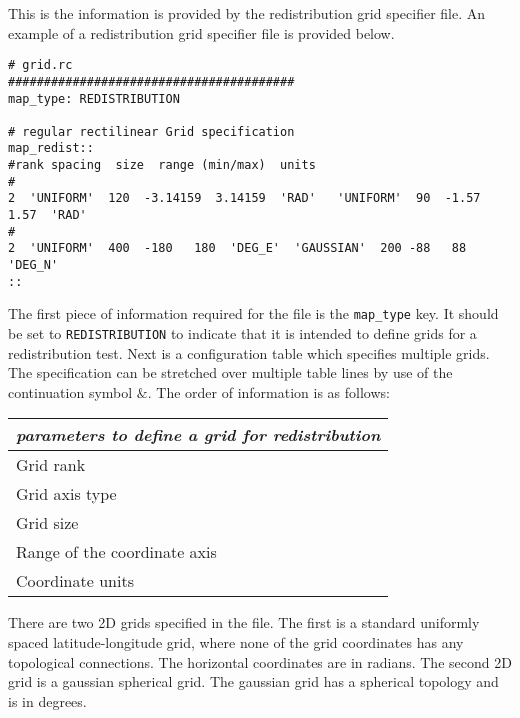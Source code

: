 This is the information is provided by the redistribution grid specifier file.
An example of a redistribution grid specifier file is provided below. 
\begin{center}
\begin{verbatim}
# grid.rc
########################################
map_type: REDISTRIBUTION

# regular rectilinear Grid specification 
map_redist::
#rank spacing  size  range (min/max)  units
#
2  'UNIFORM'  120  -3.14159  3.14159  'RAD'   'UNIFORM'  90  -1.57  1.57  'RAD'   
#
2  'UNIFORM'  400  -180   180  'DEG_E'  'GAUSSIAN'  200 -88   88   'DEG_N'  
::
\end{verbatim}
\end{center}

The first piece of information required for the file is the \texttt{map\_type} key. It should be set to \texttt{REDISTRIBUTION} to indicate that it is intended to define grids for a redistribution test. Next is a configuration table which specifies multiple grids. The specification can be stretched over multiple table lines by use of the continuation symbol $\&$. The order of information is as follows:
\begin{center}
\begin{tabular}{| l |} \hline 
{\em parameters to define a grid for redistribution }  \\
\hline \hline
 Grid rank    \\
 Grid axis type   \\
 Grid size \\
 Range of the coordinate axis  \\
 Coordinate units \\
\hline 
\end{tabular}
\end{center}
 
 There are two 2D grids specified in the file. The first is a standard uniformly spaced latitude-longitude grid, where none of the grid coordinates has any topological connections. The horizontal coordinates are in radians. The second 2D grid is a gaussian spherical grid. The gaussian grid has a spherical topology and is in degrees. 
 
